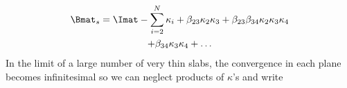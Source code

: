 \begin{multline}
  \Bmat_s = \Imat - \sum\limits^{N}_{i=2} \kappa_i + \beta_{23} \kappa_2 \kappa_3 + \beta_{23}\beta_{34} \kappa_2 \kappa_3 \kappa_4 \\
+\beta_{34} \kappa_3\kappa_4 +\ldots
\end{multline}
In the limit of a large number of very thin slabs, the convergence in each plane becomes infinitesimal so we can neglect products of $\kappa$'s and write
